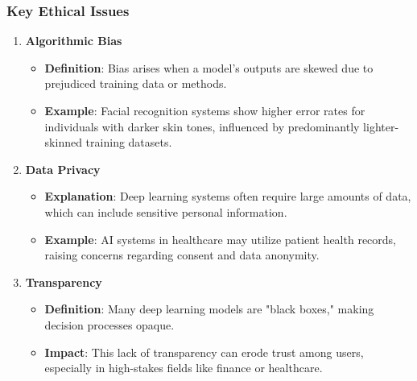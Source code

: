 \documentclass[aspectratio=169]{beamer}
\begin{document}
\begin{frame}[fragile]
    \frametitle{Key Ethical Issues}
    \begin{enumerate}
        \item \textbf{Algorithmic Bias}
        \begin{itemize}
            \item \textbf{Definition}: Bias arises when a model's outputs are skewed due to prejudiced training data or methods.
            \item \textbf{Example}: Facial recognition systems show higher error rates for individuals with darker skin tones, influenced by predominantly lighter-skinned training datasets.
        \end{itemize}
        
        \item \textbf{Data Privacy}
        \begin{itemize}
            \item \textbf{Explanation}: Deep learning systems often require large amounts of data, which can include sensitive personal information.
            \item \textbf{Example}: AI systems in healthcare may utilize patient health records, raising concerns regarding consent and data anonymity.
        \end{itemize}
        
        \item \textbf{Transparency}
        \begin{itemize}
            \item \textbf{Definition}: Many deep learning models are "black boxes," making decision processes opaque.
            \item \textbf{Impact}: This lack of transparency can erode trust among users, especially in high-stakes fields like finance or healthcare.
        \end{itemize}
    \end{enumerate}
\end{frame}
\end{document}
